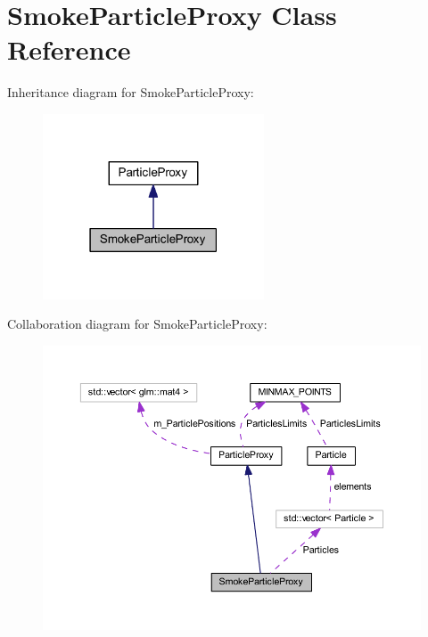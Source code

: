 \hypertarget{class_smoke_particle_proxy}{}\section{Smoke\+Particle\+Proxy Class Reference}
\label{class_smoke_particle_proxy}


Inheritance diagram for Smoke\+Particle\+Proxy\+:
\nopagebreak
\begin{figure}[H]
\begin{center}
\leavevmode
\includegraphics[width=186pt]{class_smoke_particle_proxy__inherit__graph}
\end{center}
\end{figure}


Collaboration diagram for Smoke\+Particle\+Proxy\+:
\nopagebreak
\begin{figure}[H]
\begin{center}
\leavevmode
\includegraphics[width=350pt]{class_smoke_particle_proxy__coll__graph}
\end{center}
\end{figure}
